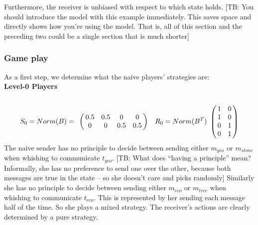 \documentclass[10pt]{article}
\newcommand{\tb}[1]{\textcolor[rgb]{.8,.33,.0}{[TB: #1]}}%
\begin{document}
Furthermore, the receiver is unbiased with respect to which state holds. \tb{You should introduce the model with this example immediately. This saves space and directly shows how you're using the model. That is, all of this section and the preceding two could be a single section that is much shorter}
\subsubsection{Game play}
As a first step, we determine what the naive players' strategies are:\\
\textbf{Level-0 Players}\\
\begin{equation*}
S_0=Norm(B)=
\bordermatrix{
            & & & &    \cr
 &       0.5 &         0.5 & 0       & 0 \cr
 &       0 &         0 & 0.5       & 0.5
 }\quad
R_0=Norm(B^T)
\bordermatrix{
            &  & \cr
    & 1 & 0 \cr
     & 1 & 0 \cr
     & 0 & 1 \cr
     & 0 & 1 \cr
 }
\end{equation*}
The naive sender has no principle to decide between sending either $m_{geo}$ or $m_{stone}$ when whishing to communicate $t_{geo}$. \tb{What does ``having a principle'' mean? Informally, she has no preference to send one over the other, because both messages are true in the state -- so she doesn't care and picks randomly} Similarly she has no principle to decide between sending either $m_{eco}$ or $m_{tree}$ when whishing to communicate $t_{eco}$. This is represented by her sending each message half of the time. So she plays a mixed strategy. The receiver's actions are clearly determined by a pure strategy.\\
\end{document}
